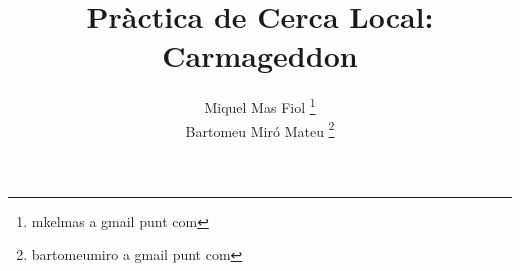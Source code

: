 \documentclass[a4paper,11pt]{scrartcl}
\title{Pràctica de Cerca Local: \\ \huge{Carmageddon}}
\author{ Miquel Mas Fiol \thanks{mkelmas a gmail punt com} \\
	 Bartomeu Miró Mateu \thanks{bartomeumiro a gmail punt com} \\}
\begin{document}
  \maketitle

  \begin{abstract}
    
  \end{abstract}

  \newpage
  \setcounter{page}{2}
  \tableofcontents
  \newpage

  
  
  
  
  
\end{document}
